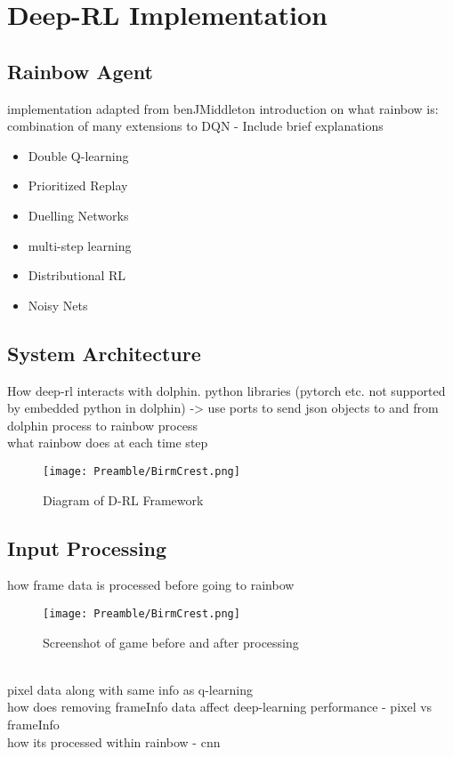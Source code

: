 
\chapter{Deep-RL Implementation}
\section{Rainbow Agent}
implementation adapted from benJMiddleton\cite{BenJMiddleton}
introduction on what rainbow is: combination of many extensions to DQN - Include brief explanations\cite{hessel2018rainbow}

\begin{itemize}
    \item Double Q-learning \cite{van2016doubleq}
    \item Prioritized Replay \cite{schaul2015prioritized}
    \item Duelling Networks \cite{wang2016dueling}
    \item multi-step learning \cite{sutton2018reinforcement}
    \item Distributional RL\cite{bellemare2017distributional}
    \item Noisy Nets\cite{DBLP:journals/corr/FortunatoAPMOGM17}
\end{itemize}

\section{System Architecture}
How deep-rl interacts with dolphin. python libraries (pytorch etc. not supported by embedded python in dolphin) -> use ports to send json objects to and from dolphin process to rainbow process
\\ what rainbow does at each time step

\begin{figure}[ht]
    \centering
    \texttt{[image: Preamble/BirmCrest.png]}
    \caption{Diagram of D-RL Framework}
    \label{fig:rainbow-arch}
\end{figure}

\section{Input Processing}
how frame data is processed before going to rainbow
\begin{figure}[ht]
    \centering
    \texttt{[image: Preamble/BirmCrest.png]}
    \caption{Screenshot of game before and after processing}
    \label{fig:frame-processing}
\end{figure}
\\pixel data along with same info as q-learning
\\how does removing frameInfo data affect deep-learning performance - pixel vs frameInfo
\\how its processed within rainbow - cnn